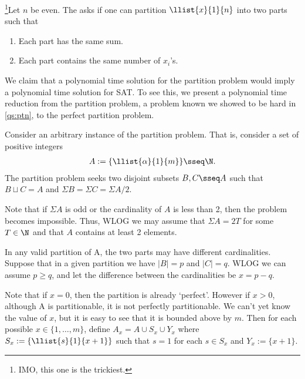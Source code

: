 \documentclass{article}
\begin{document}

\begin{subexercise}
  \footnote[3]{IMO, this one is the trickiest.}Let $n$ be even.
  The  asks if one can partition $ \llist{x}{1}{n} $ into two parts such that
  \begin{enumerate}[label=(\alph*)]
    \item Each part has the same sum.
    \item Each part contains the same number of $ x_i $'s.
  \end{enumerate}
\end{subexercise}
\begin{solution}
  We claim that a polynomial time solution for the partition problem would imply a polynomial time solution for SAT.
  To see this, we present a polynomial time reduction from the partition problem, a problem known we showed to be hard in \ref{qs:ptn}, to the perfect partition problem.

  Consider an arbitrary instance of the partition problem.
  That is, consider a set of positive integers \begin{align*}
    A := \{\llist{\alpha}{1}{m}\} \sseq \N.
  \end{align*}
  The partition problem seeks two disjoint subsets $ B,C\sseq A $ such that $ B\sqcup C = A $ and $ \Sigma B = \Sigma C = \Sigma A / 2$.

  Note that if $ \Sigma A $ is odd or the cardinality of $ A $ is less than 2, then the problem becomes impossible.
  Thus, WLOG we may assume that $ \Sigma A = 2T $ for some $ T\in \N $ and that $ A $ contains at least 2 elements.

  In any valid partition of A, the two parts may have different cardinalities.
  Suppose that in a given partition we have $ |B| = p $ and $ |C| = q $.
  WLOG we can assume $ p \geq q $, and let the difference between the cardinalities be $ x = p-q $.

  Note that if $ x = 0 $, then the partition is already `perfect'.
  However if $ x > 0 $, although A is partitionable, it is not perfectly partitionable.
  We can't yet know the value of $ x $, but it is easy to see that it is bounded above by $ m $.
  Then for each possible $ x\in \{1,\ldots,m\}$, define $ A_x = A \cup S_x \cup Y_x $ where $ S_x := \{\llist{s}{1}{x+1} \} $ such that $ s = 1 $ for each $ s\in S_x $ and $ Y_x := \{x+1\} $.


\end{solution}
\end{document}
